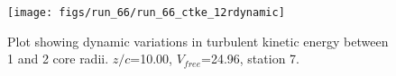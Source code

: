 \begin{figure}[H]
\centering
\texttt{[image: figs/run\_66/run\_66\_ctke\_12rdynamic]}
\caption{Plot showing dynamic variations in turbulent kinetic energy between 1 and 2 core radii. $z/c$=10.00, $V_{free}$=24.96, station 7.}
\end{figure}


